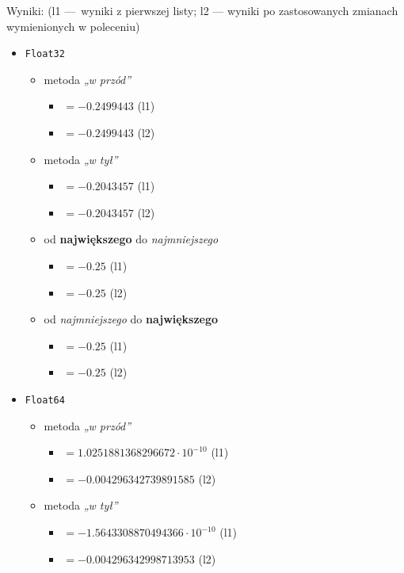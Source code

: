 \documentclass[10pt]{article}
\begin{document}
Wyniki:
(l1 — wyniki z pierwszej listy; l2 — wyniki po zastosowanych zmianach wymienionych w poleceniu)
\begin{itemize}
    \item \texttt{Float32}
    \begin{itemize}
        \item metoda \textit{„w przód”}
        \begin{itemize}
            \item $= -0.2499443$ (l1)
            \item $= -0.2499443$ (l2)
        \end{itemize}
        \item metoda \textit{„w tył”}
        \begin{itemize}
            \item $= -0.2043457$ (l1)
            \item $= -0.2043457$ (l2)
        \end{itemize}
        \item od \textbf{największego} do \textit{najmniejszego}
        \begin{itemize}
            \item $= -0.25$ (l1)
            \item $= -0.25$ (l2)
        \end{itemize}
        \item od \textit{najmniejszego} do \textbf{największego}
        \begin{itemize}
            \item $= -0.25$ (l1)
            \item $= -0.25$ (l2)
        \end{itemize}
    \end{itemize}
    \item \texttt{Float64}
    \begin{itemize}
        \item metoda \textit{„w przód”}
        \begin{itemize}
            \item $= 1.0251881368296672 \cdot 10^{-10}$ (l1)
            \item $= -0.004296342739891585$ (l2)
        \end{itemize}
        \item metoda \textit{„w tył”}
        \begin{itemize}
            \item $= -1.5643308870494366 \cdot 10^{-10}$ (l1)
            \item $= -0.004296342998713953$ (l2)

\end{itemize}
\end{itemize}
\end{itemize}
\end{document}
